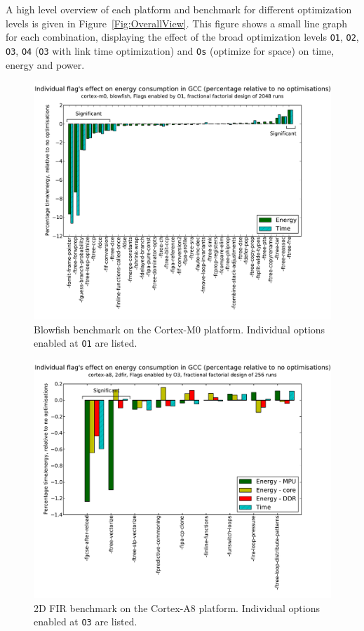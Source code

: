 \documentclass[twocolumn]{article}
\let\oldcaption\caption
\renewcommand{\caption}[1]{\oldcaption{\textup{#1}}}
\begin{document}
A high level overview of each platform and benchmark for different optimization levels is given in Figure~\ref{Fig:OverallView}. This figure shows a small line graph for each combination, displaying the effect of the broad optimization levels \texttt{O1}, \texttt{O2}, \texttt{O3}, \texttt{O4} (\texttt{O3} with link time optimization) and \texttt{Os} (optimize for space) on time, energy and power.

\begin{figure}[t]
	\includegraphics[width=\linewidth,clip,trim=0.5cm 0 2cm 1.8cm]{cortex-m0/O1_main_effects_blowfish.pdf}
	\caption{Blowfish benchmark on the Cortex-M0 platform. Individual options enabled at \texttt{O1} are listed.}
	\label{Fig:BlowfishMainEffects}
\end{figure}

\begin{figure}[t]
	\includegraphics[width=\linewidth,clip,trim=0.5cm 0 2cm 1.8cm]{cortex-a8/O3_main_effects_2dfir.pdf}
	\caption{2D FIR benchmark on the Cortex-A8 platform. Individual options enabled at \texttt{O3} are listed.}
	\label{Fig:O3_2dfir_A8}
\end{figure}
\end{document}
